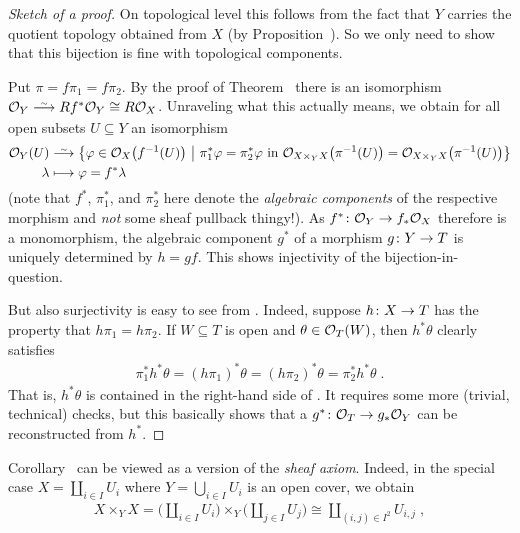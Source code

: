 \documentclass[a4paper,parskip=half,numbers=enddot, DIV=12]{scrreprt}
\begin{document}
\begin{proof}[Sketch of a proof]
	On topological level this follows from the fact that $Y$ carries the quotient topology obtained from $X$ (by Proposition~). So we only need to show that this bijection is fine with topological components. 
	
	Put $\pi=f\pi_1=f\pi_2$. By the proof of Theorem~ there is an isomorphism $\Oo_Y\isomorphism Rf^*\Oo_Y\cong R\Oo_X$. Unraveling what this actually means, we obtain for all open subsets $U\subseteq Y$ an isomorphism
	\begin{align}\lbl{eq:OYcongROX}
		\begin{split}
			\Oo_Y(U)&\isomorphism \left\{\phi\in\Oo_X\big(f^{-1}(U)\big)\st \pi_1^*\phi=\pi_2^*\phi\text{ in }\Oo_{X\times_YX}\big(\pi^{-1}(U)\big)=\Oo_{X\times_YX}\big(\pi^{-1}(U)\big)\right\}\\
			\lambda&\longmapsto \phi=f^*\lambda
		\end{split}		
	\end{align}
	(note that $f^*$, $\pi_1^*$, and $\pi_2^*$ here denote the \emph{algebraic components} of the respective morphism and \emph{not} some sheaf pullback thingy!). As $f^*\colon\Oo_Y\morphism f_*\Oo_X$ therefore is a monomorphism, the algebraic component $g^*$ of a morphism $g\colon Y\morphism T$ is uniquely determined by $h=gf$. This shows injectivity of the bijection-in-question.
	
	But also surjectivity is easy to see from . Indeed, suppose $h\colon X\morphism T$ has the property that $h\pi_1=h\pi_2$. If $W\subseteq T$ is open and $\theta\in\mathcal{O}_T(W)$, then $h^*\theta$ clearly satisfies 
	\begin{align*}
		\pi_1^*h^*\theta=(h\pi_1)^*\theta=(h\pi_2)^*\theta=\pi_2^*h^*\theta\;.
	\end{align*}
	That is, $h^*\theta$ is contained in the right-hand side of . It requires some more (trivial, technical) checks, but this basically shows that a $g^*\colon \Oo_T\morphism g_*\Oo_Y$ can be reconstructed from $h^*$.
\end{proof}
Corollary~ can be viewed as a version of the \emph{sheaf axiom}. Indeed, in the special case $X=\coprod_{i\in I}U_i$ where $Y=\bigcup_{i\in I} U_i$ is an open cover, we obtain
\begin{align*}
	X\times_YX=\bigg(\coprod_{i\in I}U_i\bigg)\times_Y\bigg(\coprod_{j\in I}U_j\bigg)\cong\coprod_{(i,j)\in I^2}U_{i,j}\;,
\end{align*}
\end{document}
